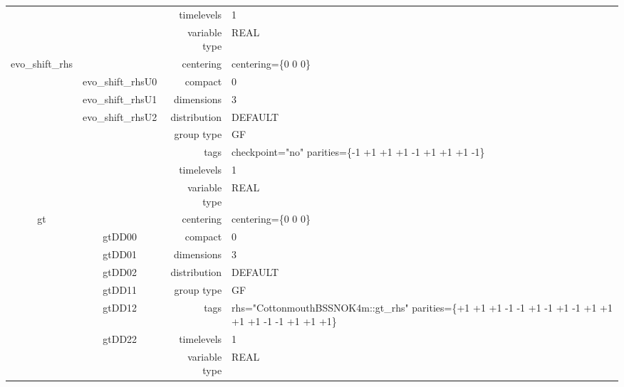 \documentclass{article}
\begin{document}
\begin{tabular*}{150mm}{|c|c@{\extracolsep{\fill}}|rl|}
 &  & timelevels & 1 \\ 
 &  & variable type & REAL \\ 
\hline 
evo\_shift\_rhs &  & centering & centering=\{0 0 0\} \\ 
 & evo\_shift\_rhsU0 & compact & 0 \\ 
 & evo\_shift\_rhsU1 & dimensions & 3 \\ 
 & evo\_shift\_rhsU2 & distribution & DEFAULT \\ 
 &  & group type & GF \\ 
 &  & tags & checkpoint="no" parities=\{-1 +1 +1  +1 -1 +1  +1 +1 -1\} \\ 
 &  & timelevels & 1 \\ 
 &  & variable type & REAL \\ 
\hline 
gt &  & centering & centering=\{0 0 0\} \\ 
 & gtDD00 & compact & 0 \\ 
 & gtDD01 & dimensions & 3 \\ 
 & gtDD02 & distribution & DEFAULT \\ 
 & gtDD11 & group type & GF \\ 
 & gtDD12 & tags & rhs="CottonmouthBSSNOK4m::gt\_rhs" parities=\{+1 +1 +1  -1 -1 +1  -1 +1 -1  +1 +1 +1  +1 -1 -1  +1 +1 +1\} \\ 
 & gtDD22 & timelevels & 1 \\ 
 &  & variable type & REAL \\ 
\hline 
\end{tabular*} 



\vspace{5mm}
\vspace{5mm}
\end{document}
